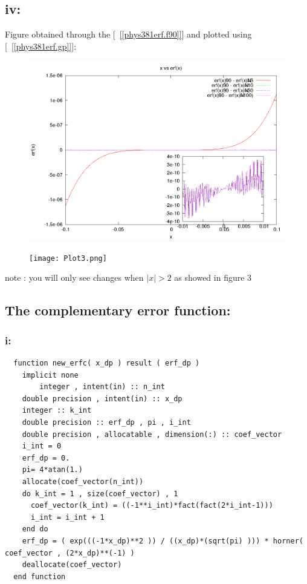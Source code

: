 \documentclass[twocolumn]{article}
\begin{document}
\subsection{iv:}	
\onecolumn
{
Figure obtained through the [{~\ref{[phys381erf.f90]}}] and plotted using [~\ref{[phys381erf.gp]}]:\\
\begin{figure}[!h]
\includegraphics[width=1.1\textwidth]{Plot2.png}
\end{figure}
}
\onecolumn
{
\begin{figure}[!h]
\texttt{[image: Plot3.png]}
\end{figure}
}

note : you will only see changes when $ |x| > 2 $ as showed in figure 3
\subsection{The complementary error function:}
\subsubsection{i:}			
\begin{verbatim}
  function new_erfc( x_dp ) result ( erf_dp )
    implicit none
    	integer , intent(in) :: n_int
    double precision , intent(in) :: x_dp
    integer :: k_int   
    double precision :: erf_dp , pi , i_int
    double precision , allocatable , dimension(:) :: coef_vector 
    i_int = 0
    erf_dp = 0.
    pi= 4*atan(1.)
    allocate(coef_vector(n_int))
    do k_int = 1 , size(coef_vector) , 1
      coef_vector(k_int) = ((-1**i_int)*fact(fact(2*i_int-1)))
      i_int = i_int + 1
    end do
    erf_dp = ( exp(((-1*x_dp)**2 )) / ((x_dp)*(sqrt(pi) ))) * horner( coef_vector , (2*x_dp)**(-1) )
    deallocate(coef_vector)
  end function
\end{verbatim}											
\end{document}
